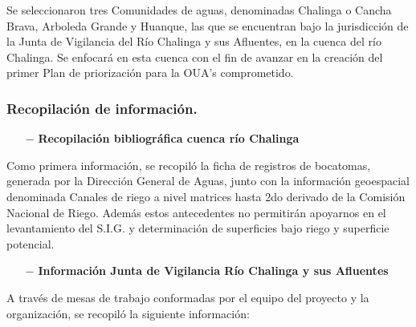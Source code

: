\documentclass[]{article}
\begin{document}
Se seleccionaron tres Comunidades de aguas, denominadas Chalinga o Cancha Brava, Arboleda Grande y Huanque, las que se encuentran bajo la jurisdicción de la Junta de Vigilancia del Río Chalinga y sus Afluentes, en la cuenca del río Chalinga. Se enfocará en esta cuenca con el fin de avanzar en la creación del primer Plan de priorización para la OUA's comprometido.

\subsubsection{Recopilación de información.}

\begin{itemize}
	\item[$-$] \textbf{Recopilación bibliográfica cuenca río Chalinga}
\end{itemize}

Como primera información, se recopiló la ficha de registros de bocatomas, generada por la Dirección General de Aguas, junto con la información geoespacial denominada Canales de riego a nivel matrices hasta 2do derivado de la Comisión Nacional de Riego. Además estos antecedentes no permitirán apoyarnos en el levantamiento del S.I.G. y determinación de superficies bajo riego y superficie potencial.

\begin{itemize}
	\item[$-$] \textbf{Información Junta de Vigilancia Río Chalinga y sus Afluentes}
\end{itemize}

A través de mesas de trabajo conformadas por el equipo del proyecto y la organización, se recopiló la siguiente información:
\end{document}
